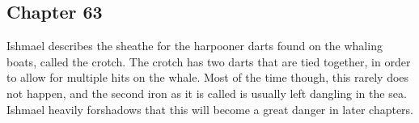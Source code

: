 \subsection{Chapter 63}

Ishmael describes the sheathe for the harpooner darts found on the whaling
boats, called the crotch. The crotch has two darts that are tied together, in
order to allow for multiple hits on the whale. Most of the time though, this
rarely does not happen, and the second iron as it is called is usually left
dangling in the sea. Ishmael heavily forshadows that this will become a great
danger in later chapters.
